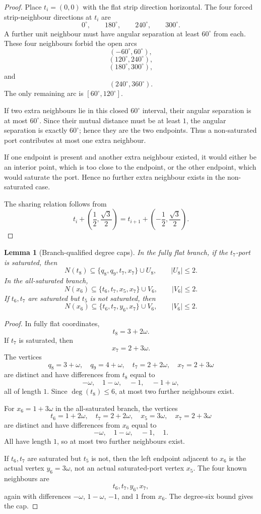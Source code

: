 \documentclass[11pt]{article}
\theoremstyle{plain}
\newtheorem{lemma}{Lemma}
\numberwithin{equation}{section}
\begin{document}
\begin{proof}
Place $t_i=(0,0)$ with the flat strip direction horizontal. The four forced strip-neighbour directions at $t_i$ are
\[
 0^\circ,
 \qquad 180^\circ,
 \qquad 240^\circ,
 \qquad 300^\circ.
\]
A further unit neighbour must have angular separation at least $60^\circ$ from each. These four neighbours forbid the open arcs
\[
 (-60^\circ,60^\circ),
\]
\[
 (120^\circ,240^\circ),
\]
\[
 (180^\circ,300^\circ),
\]
and
\[
 (240^\circ,360^\circ).
\]
The only remaining arc is $[60^\circ,120^\circ]$.

If two extra neighbours lie in this closed $60^\circ$ interval, their angular separation is at most $60^\circ$. Since their mutual distance must be at least $1$, the angular separation is exactly $60^\circ$; hence they are the two endpoints. Thus a non-saturated port contributes at most one extra neighbour.

If one endpoint is present and another extra neighbour existed, it would either be an interior point, which is too close to the endpoint, or the other endpoint, which would saturate the port. Hence no further extra neighbour exists in the non-saturated case.

The sharing relation follows from
\[
 t_i+\left(\frac12,\frac{\sqrt3}{2}\right)
 =t_{i+1}+\left(-\frac12,\frac{\sqrt3}{2}\right).
\]
\end{proof}

\begin{lemma}[Branch-qualified degree caps]\label{lem:degree-caps}
In the fully flat branch, if the $t_7$-port is saturated, then
\[
 N(t_8)\subseteq\{q_8,q_9,t_7,x_7\}\cup U_8,
 \qquad |U_8|\le2.
\]
In the all-saturated branch,
\[
 N(x_6)\subseteq\{t_6,t_7,x_5,x_7\}\cup V_6,
 \qquad |V_6|\le2.
\]
If $t_6,t_7$ are saturated but $t_5$ is not saturated, then
\[
 N(x_6)\subseteq\{t_6,t_7,y_6,x_7\}\cup V_6,
 \qquad |V_6|\le2.
\]
\end{lemma}

\begin{proof}
In fully flat coordinates,
\[
 t_8=3+2\omega.
\]
If $t_7$ is saturated, then
\[
 x_7=2+3\omega.
\]
The vertices
\[
 q_8=3+\omega,
 \quad
 q_9=4+\omega,
 \quad
 t_7=2+2\omega,
 \quad
 x_7=2+3\omega
\]
are distinct and have differences from $t_8$ equal to
\[
 -\omega,
 \quad
 1-\omega,
 \quad
 -1,
 \quad
 -1+\omega,
\]
all of length $1$. Since $\deg(t_8)\le6$, at most two further neighbours exist.

For $x_6=1+3\omega$ in the all-saturated branch, the vertices
\[
 t_6=1+2\omega,
 \quad
 t_7=2+2\omega,
 \quad
 x_5=3\omega,
 \quad
 x_7=2+3\omega
\]
are distinct and have differences from $x_6$ equal to
\[
 -\omega,
 \quad
 1-\omega,
 \quad
 -1,
 \quad
 1.
\]
All have length $1$, so at most two further neighbours exist.

If $t_6,t_7$ are saturated but $t_5$ is not, then the left endpoint adjacent to $x_6$ is the actual vertex $y_6=3\omega$, not an actual saturated-port vertex $x_5$. The four known neighbours are
\[
 t_6,t_7,y_6,x_7,
\]
again with differences $-\omega$, $1-\omega$, $-1$, and $1$ from $x_6$. The degree-six bound gives the cap.
\end{proof}
\end{document}
